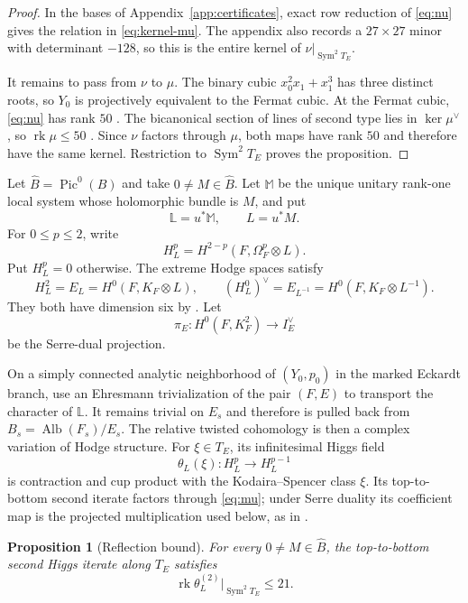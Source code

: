 \documentclass[11pt,reqno]{amsart}
\numberwithin{equation}{section}
\newtheorem{proposition}[theorem]{Proposition}
\theoremstyle{definition}
\theoremstyle{remark}
\newcommand{\rk}{\operatorname{rk}}
\newcommand{\Alb}{\operatorname{Alb}}
\newcommand{\Pic}{\operatorname{Pic}}
\newcommand{\Sym}{\operatorname{Sym}}
\begin{document}
\begin{proof}
In the bases of Appendix~\ref{app:certificates}, exact row reduction of \eqref{eq:nu} gives the relation in \eqref{eq:kernel-mu}.  The appendix also records a $27\times27$ minor with determinant $-128$, so this is the entire kernel of $\nu|_{\Sym^2T_E}$.

It remains to pass from $\nu$ to $\mu$.  The binary cubic $x_0^2x_1+x_1^3$ has three distinct roots, so $Y_0$ is projectively equivalent to the Fermat cubic.  At the Fermat cubic, \eqref{eq:nu} has rank $50$ \cite[Proposition~3.6]{KLM2026}.  The bicanonical section of lines of second type lies in $\ker\mu^\vee$, so $\rk\mu\le50$ \cite[Proposition~3.7]{KLM2026}.  Since $\nu$ factors through $\mu$, both maps have rank $50$ and therefore have the same kernel.  Restriction to $\Sym^2T_E$ proves the proposition.
\end{proof}

Let $\widehat B=\Pic^0(B)$ and take $0\ne M\in\widehat B$.  Let $\mathbb M$ be the unique unitary rank-one local system whose holomorphic bundle is $M$, and put
\[
\mathbb L=u^*\mathbb M,
\qquad L=u^*M.
\]
For $0\le p\le2$, write
\[
H_L^p=H^{2-p}(F,\Omega_F^p\otimes L).
\]
Put $H_L^p=0$ otherwise.  The extreme Hodge spaces satisfy
\[
H_L^2=E_L=H^0(F,K_F\otimes L),
\qquad
(H_L^0)^\vee=E_{L^{-1}}=H^0(F,K_F\otimes L^{-1}).
\]
They both have dimension six by \cite[Lemma~3.3]{KLM2026}.  Let
\[
\pi_E:H^0(F,K_F^2)\longrightarrow I_E^\vee
\]
be the Serre-dual projection.

On a simply connected analytic neighborhood of $(Y_0,p_0)$ in the marked Eckardt branch, use an Ehresmann trivialization of the pair $(F,E)$ to transport the character of $\mathbb L$.  It remains trivial on $E_s$ and therefore is pulled back from $B_s=\Alb(F_s)/E_s$.  The relative twisted cohomology is then a complex variation of Hodge structure.  For $\xi\in T_E$, its infinitesimal Higgs field
\[
\theta_L(\xi):H_L^p\longrightarrow H_L^{p-1}
\]
is contraction and cup product with the Kodaira--Spencer class $\xi$.  Its top-to-bottom second iterate factors through \eqref{eq:mu}; under Serre duality its coefficient map is the projected multiplication used below, as in \cite[Equation~(2.1) and the proof of Proposition~2.6]{KLM2026}.

\begin{proposition}[Reflection bound]\label{prop:reflection-bound}
For every $0\ne M\in\widehat B$, the top-to-bottom second Higgs iterate along $T_E$ satisfies
\begin{equation}\label{eq:upper21}
\rk\theta_L^{(2)}|_{\Sym^2T_E}\le21.
\end{equation}
\end{proposition}
\end{document}
